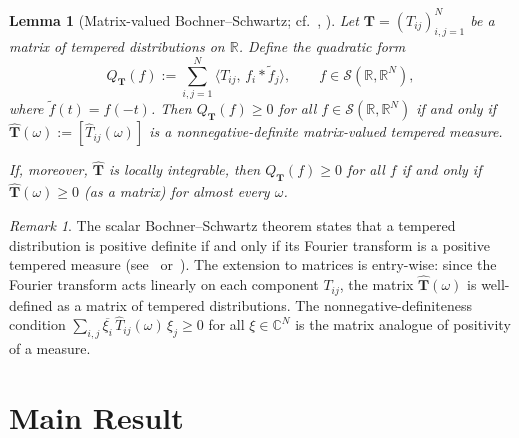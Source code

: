 \documentclass[12pt]{article}
\newtheorem{lemma}[theorem]{Lemma}
\theoremstyle{definition}
\theoremstyle{remark}
\newtheorem{remark}[theorem]{Remark}
\newcommand{\R}{\mathbb{R}}
\newcommand{\C}{\mathbb{C}}
\begin{document}
\begin{lemma}[Matrix-valued Bochner--Schwartz; cf.~{\cite[Thm.~IX.10]{ReedSimon1975}},
{\cite[\S4]{AlfonsiKlockSchied2016}}]\label{lem:BS}
Let $\mathbf{T}=(T_{ij})_{i,j=1}^N$ be a matrix of tempered distributions on $\R$.
Define the quadratic form
\[
  Q_{\mathbf{T}}(f) :=
  \sum_{i,j=1}^N \langle T_{ij},\, f_i * \widetilde{f}_j\rangle,
  \qquad f\in\mathcal{S}(\R,\R^N),
\]
where $\widetilde{f}(t)=f(-t)$.
Then $Q_{\mathbf{T}}(f)\ge 0$ for all $f\in\mathcal{S}(\R,\R^N)$ if and only if
$\widehat{\mathbf{T}}(\omega) := [\widehat{T}_{ij}(\omega)]$ is a nonnegative-definite
matrix-valued tempered measure.

If, moreover, $\widehat{\mathbf{T}}$ is locally integrable, then $Q_{\mathbf{T}}(f)\ge 0$
for all $f$ if and only if $\widehat{\mathbf{T}}(\omega)\ge 0$ (as a matrix) for
almost every $\omega$.
\end{lemma}

\begin{remark}
The scalar Bochner--Schwartz theorem states that a tempered distribution is positive definite
if and only if its Fourier transform is a positive tempered measure
(see~\cite[Thm.~IX.10]{ReedSimon1975} or~\cite[\S IV.4]{Sasvari2013}).
The extension to matrices is entry-wise: since the Fourier transform acts linearly on each
component $T_{ij}$, the matrix $\widehat{\mathbf{T}}(\omega)$ is well-defined as a matrix
of tempered distributions.  The nonnegative-definiteness condition
$\sum_{i,j} \overline{\xi_i}\,\widehat{T}_{ij}(\omega)\,\xi_j \ge 0$ for all $\xi\in\C^N$
is the matrix analogue of positivity of a measure.
\end{remark}


\section{Main Result}\label{sec:main}
\end{document}
